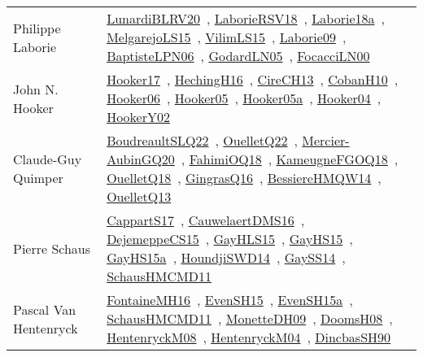 {\begin{longtable}{p{4cm}p{20cm}}
Philippe Laborie & \href{works/LunardiBLRV20.pdf}{LunardiBLRV20}~\cite{LunardiBLRV20}, \href{works/LaborieRSV18.pdf}{LaborieRSV18}~\cite{LaborieRSV18}, \href{works/Laborie18a.pdf}{Laborie18a}~\cite{Laborie18a}, \href{works/MelgarejoLS15.pdf}{MelgarejoLS15}~\cite{MelgarejoLS15}, \href{works/VilimLS15.pdf}{VilimLS15}~\cite{VilimLS15}, \href{works/Laborie09.pdf}{Laborie09}~\cite{Laborie09}, \href{}{BaptisteLPN06}~\cite{BaptisteLPN06}, \href{}{GodardLN05}~\cite{GodardLN05}, \href{works/FocacciLN00.pdf}{FocacciLN00}~\cite{FocacciLN00}\\
John N. Hooker & \href{works/Hooker17.pdf}{Hooker17}~\cite{Hooker17}, \href{works/HechingH16.pdf}{HechingH16}~\cite{HechingH16}, \href{works/CireCH13.pdf}{CireCH13}~\cite{CireCH13}, \href{works/CobanH10.pdf}{CobanH10}~\cite{CobanH10}, \href{works/Hooker06.pdf}{Hooker06}~\cite{Hooker06}, \href{works/Hooker05.pdf}{Hooker05}~\cite{Hooker05}, \href{works/Hooker05a.pdf}{Hooker05a}~\cite{Hooker05a}, \href{works/Hooker04.pdf}{Hooker04}~\cite{Hooker04}, \href{works/HookerY02.pdf}{HookerY02}~\cite{HookerY02}\\
Claude{-}Guy Quimper & \href{works/BoudreaultSLQ22.pdf}{BoudreaultSLQ22}~\cite{BoudreaultSLQ22}, \href{works/OuelletQ22.pdf}{OuelletQ22}~\cite{OuelletQ22}, \href{works/Mercier-AubinGQ20.pdf}{Mercier-AubinGQ20}~\cite{Mercier-AubinGQ20}, \href{works/FahimiOQ18.pdf}{FahimiOQ18}~\cite{FahimiOQ18}, \href{works/KameugneFGOQ18.pdf}{KameugneFGOQ18}~\cite{KameugneFGOQ18}, \href{works/OuelletQ18.pdf}{OuelletQ18}~\cite{OuelletQ18}, \href{works/GingrasQ16.pdf}{GingrasQ16}~\cite{GingrasQ16}, \href{works/BessiereHMQW14.pdf}{BessiereHMQW14}~\cite{BessiereHMQW14}, \href{works/OuelletQ13.pdf}{OuelletQ13}~\cite{OuelletQ13}\\
Pierre Schaus & \href{works/CappartS17.pdf}{CappartS17}~\cite{CappartS17}, \href{works/CauwelaertDMS16.pdf}{CauwelaertDMS16}~\cite{CauwelaertDMS16}, \href{works/DejemeppeCS15.pdf}{DejemeppeCS15}~\cite{DejemeppeCS15}, \href{works/GayHLS15.pdf}{GayHLS15}~\cite{GayHLS15}, \href{works/GayHS15.pdf}{GayHS15}~\cite{GayHS15}, \href{works/GayHS15a.pdf}{GayHS15a}~\cite{GayHS15a}, \href{works/HoundjiSWD14.pdf}{HoundjiSWD14}~\cite{HoundjiSWD14}, \href{works/GaySS14.pdf}{GaySS14}~\cite{GaySS14}, \href{works/SchausHMCMD11.pdf}{SchausHMCMD11}~\cite{SchausHMCMD11}\\
Pascal Van Hentenryck & \href{works/FontaineMH16.pdf}{FontaineMH16}~\cite{FontaineMH16}, \href{works/EvenSH15.pdf}{EvenSH15}~\cite{EvenSH15}, \href{works/EvenSH15a.pdf}{EvenSH15a}~\cite{EvenSH15a}, \href{works/SchausHMCMD11.pdf}{SchausHMCMD11}~\cite{SchausHMCMD11}, \href{works/MonetteDH09.pdf}{MonetteDH09}~\cite{MonetteDH09}, \href{works/DoomsH08.pdf}{DoomsH08}~\cite{DoomsH08}, \href{works/HentenryckM08.pdf}{HentenryckM08}~\cite{HentenryckM08}, \href{works/HentenryckM04.pdf}{HentenryckM04}~\cite{HentenryckM04}, \href{works/DincbasSH90.pdf}{DincbasSH90}~\cite{DincbasSH90}\\

\end{longtable}}
